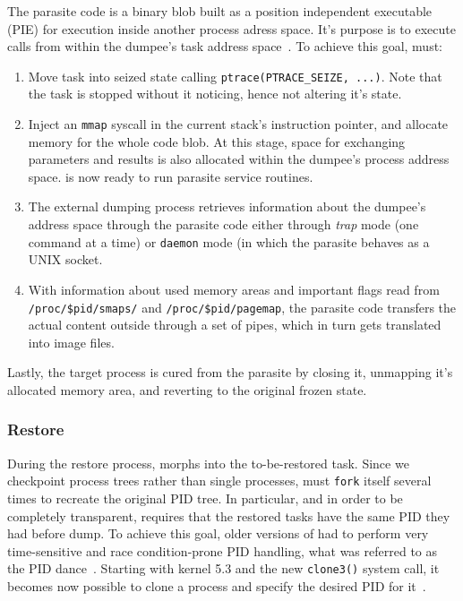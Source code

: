 The parasite code is a binary blob built as a position independent executable (PIE) for execution inside another process adress space.
It's purpose is to execute \criu calls from within the dumpee's task address space~\cite{criu-parasite-code}.
To achieve this goal, \criu must:
\begin{enumerate}
    \item Move task into seized state calling \texttt{ptrace(PTRACE\_SEIZE, ...)}. Note that the task is stopped without it noticing, hence not altering it's state.
    \item Inject an \texttt{mmap} syscall in the current stack's instruction pointer, and allocate memory for the whole code blob. At this stage, space for exchanging parameters and results is also allocated within the dumpee's process address space. \criu is now ready to run parasite service routines.
    \item The external dumping process retrieves information about the dumpee's address space through the parasite code either through \emph{trap} mode (one command at a time) or \texttt{daemon} mode (in which the parasite behaves as a UNIX socket.
    \item With information about used memory areas and important flags read from \texttt{/proc/\$pid/smaps/} and \texttt{/proc/\$pid/pagemap}, the parasite code transfers the actual content outside through a set of pipes, which in turn gets translated into image files.
\end{enumerate}
Lastly, the target process is cured from the parasite by closing it, unmapping it's allocated memory area, and reverting to the original frozen state.

\subsubsection*{Restore}

During the restore process, \criu morphs into the to-be-restored task.
Since we checkpoint process trees rather than single processes, \criu must \texttt{fork} itself several times to recreate the original PID tree.
In particular, and in order to be completely transparent, \criu requires that the restored tasks have the same PID they had before dump.
To achieve this goal, older versions of \criu had to perform very time-sensitive and race condition-prone PID handling, what was referred to as the PID dance~\cite{Reber2019,criu-pid-dance}.
Starting with kernel 5.3 and the new \texttt{clone3()} system call, it becomes now possible to clone a process and specify the desired PID for it~\cite{kernel-clone3}.

